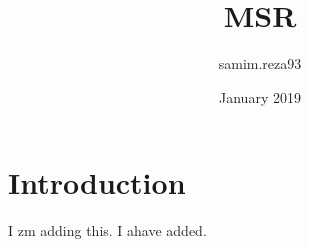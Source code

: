 \documentclass{article}
\title{MSR}
\author{samim.reza93 }
\date{January 2019}
\begin{document}
\maketitle

\section{Introduction}
I zm adding this.
I ahave added.


\end{document}
